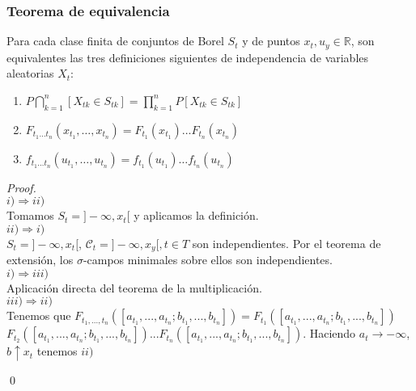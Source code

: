 \subsubsection{Teorema de equivalencia}
\begin{theorem}
Para cada clase finita de conjuntos de Borel $S_t$ y de puntos $x_t, u_y \in \mathbb{R}$, son equivalentes las tres definiciones siguientes de independencia de variables aleatorias $X_t$:
\begin{enumerate}
\item $P\bigcap_{k=1}^n [X_{tk}\in S_{tk}]=\displaystyle\prod_{k=1}^n P[X_{tk}\in S_{tk}]$
\item $F_{t_1\ldots t_n}(x_{t_1},\ldots ,x_{t_n})=F_{t_1}(x_{t_1})\ldots F_{t_n}(x_{t_n})$
\item $f_{t_1\ldots t_n}(u_{t_1},\ldots ,u_{t_n})=f_{t_1}(u_{t_1})\ldots f_{t_n}(u_{t_n})$
\end{enumerate}
\end{theorem}
\begin{proof}$\,$\\
$i) \Rightarrow ii)$\\
Tomamos $S_t = ]-\infty, x_t[$ y aplicamos la definición.\\
$ii) \Rightarrow i)$\\
$S_t = ]-\infty, x_t[$,  $\mathcal{C}_t = {]-\infty, x_y[, t \in T}$ 
son independientes. 
Por el teorema de extensión, los $\sigma$-campos minimales sobre ellos son independientes.\\
$i) \Rightarrow iii)$\\
Aplicación directa del teorema de la multiplicación.\\
$iii) \Rightarrow ii)$\\
Tenemos que $F_{t_1,...,t_n}([a_{t_1},...,a_{t_n};b_{t_1},...,b_{t_n}]) = F_{t_1}([a_{t_1},...,a_{t_n};b_{t_1},...,b_{t_n}])$\\$F_{t_2}([a_{t_1},...,a_{t_n};b_{t_1},...,b_{t_n}])...F_{t_n}([a_{t_1},...,a_{t_n};b_{t_1},...,b_{t_n}])$. Haciendo $a_t \rightarrow - \infty$, $b \uparrow x_t$ tenemos $ii)$

\qed
\end{proof}

